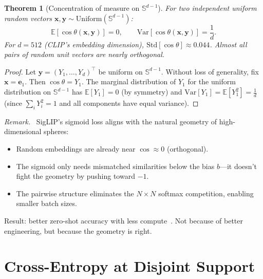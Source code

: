 \documentclass[11pt,a4paper]{article}
\newtheorem{theorem}{Theorem}
\theoremstyle{remark}
\newenvironment{keyresult}{\par\medskip\noindent\textit{Remark.}\ }{\par\medskip}
\begin{document}
\begin{theorem}[Concentration of measure on $\mathbb{S}^{d-1}$]
\label{thm:concentration}
For two independent uniform random vectors $\mathbf{x}, \mathbf{y} \sim \mathrm{Uniform}(\mathbb{S}^{d-1})$:
\begin{equation}
  \mathbb{E}[\cos\theta(\mathbf{x}, \mathbf{y})] = 0, \qquad \mathrm{Var}[\cos\theta(\mathbf{x}, \mathbf{y})] = \frac{1}{d}.
  \label{eq:concentration}
\end{equation}
For $d = 512$ (CLIP's embedding dimension), $\mathrm{Std}[\cos\theta] \approx 0.044$.
Almost all pairs of random unit vectors are nearly orthogonal.
\end{theorem}

\begin{proof}
Let $\mathbf{y} = (Y_1, \dots, Y_d)^\top$ be uniform on $\mathbb{S}^{d-1}$.
Without loss of generality, fix $\mathbf{x} = \mathbf{e}_1$.
Then $\cos\theta = Y_1$.
The marginal distribution of $Y_1$ for the uniform distribution on $\mathbb{S}^{d-1}$ has $\mathbb{E}[Y_1] = 0$ (by symmetry) and $\mathrm{Var}[Y_1] = \mathbb{E}[Y_1^2] = \frac{1}{d}$ (since $\sum_i Y_i^2 = 1$ and all components have equal variance).
\end{proof}

\begin{keyresult}
SigLIP's sigmoid loss aligns with the natural geometry of high-dimensional spheres:
\begin{itemize}
  \item Random embeddings are already near $\cos \approx 0$ (orthogonal).
  \item The sigmoid only needs mismatched similarities below the bias $b$---it doesn't fight the geometry by pushing toward $-1$.
  \item The pairwise structure eliminates the $N \times N$ softmax competition, enabling smaller batch sizes.
\end{itemize}
Result: better zero-shot accuracy with less compute~\cite{zhai2023siglip}.
Not because of better engineering, but because the geometry is right.
\end{keyresult}


\section{Cross-Entropy at Disjoint Support}
\label{sec:entropy}
\end{document}
